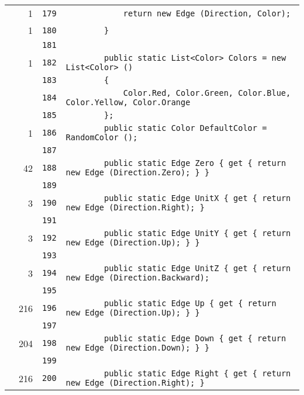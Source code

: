 \documentclass[a4paper,10pt]{article}
\begin{document}
\begin{longtable}[l]{lrrl}
\cellcolor{green} & 1 & \verb~179~ & \verb~            return new Edge (Direction, Color);~\\
\cellcolor{green} & 1 & \verb~180~ & \verb~        }~\\
\cellcolor{gray} &  & \verb~181~ & \verb~~\\
\cellcolor{green} & 1 & \verb~182~ & \verb~        public static List<Color> Colors = new List<Color> ()~\\
\cellcolor{gray} &  & \verb~183~ & \verb~        {~\\
\cellcolor{gray} &  & \verb~184~ & \verb~            Color.Red, Color.Green, Color.Blue, Color.Yellow, Color.Orange~\\
\cellcolor{gray} &  & \verb~185~ & \verb~        };~\\
\cellcolor{green} & 1 & \verb~186~ & \verb~        public static Color DefaultColor = RandomColor ();~\\
\cellcolor{gray} &  & \verb~187~ & \verb~~\\
\cellcolor{green} & 42 & \verb~188~ & \verb~        public static Edge Zero { get { return new Edge (Direction.Zero); } }~\\
\cellcolor{gray} &  & \verb~189~ & \verb~~\\
\cellcolor{green} & 3 & \verb~190~ & \verb~        public static Edge UnitX { get { return new Edge (Direction.Right); } ~\\
\cellcolor{gray} &  & \verb~191~ & \verb~~\\
\cellcolor{green} & 3 & \verb~192~ & \verb~        public static Edge UnitY { get { return new Edge (Direction.Up); } }~\\
\cellcolor{gray} &  & \verb~193~ & \verb~~\\
\cellcolor{green} & 3 & \verb~194~ & \verb~        public static Edge UnitZ { get { return new Edge (Direction.Backward);~\\
\cellcolor{gray} &  & \verb~195~ & \verb~~\\
\cellcolor{green} & 216 & \verb~196~ & \verb~        public static Edge Up { get { return new Edge (Direction.Up); } }~\\
\cellcolor{gray} &  & \verb~197~ & \verb~~\\
\cellcolor{green} & 204 & \verb~198~ & \verb~        public static Edge Down { get { return new Edge (Direction.Down); } }~\\
\cellcolor{gray} &  & \verb~199~ & \verb~~\\
\cellcolor{green} & 216 & \verb~200~ & \verb~        public static Edge Right { get { return new Edge (Direction.Right); } ~\\

\end{longtable}
\end{document}
